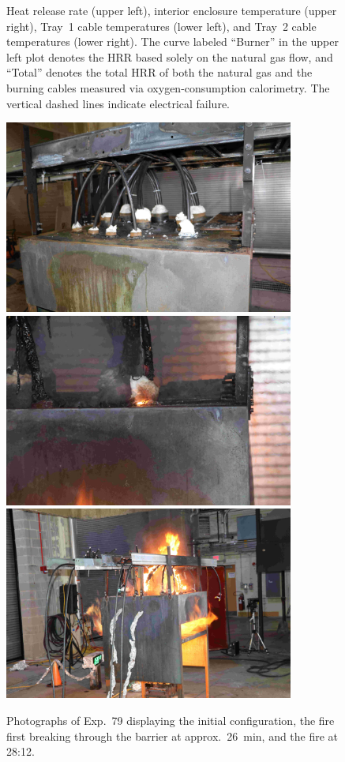 \begin{figure}[H]
\caption[HRR and temperatures of Exp.~79]{Heat release rate (upper left), interior enclosure temperature (upper right), Tray~1 cable temperatures (lower left), and Tray~2 cable temperatures (lower right). The curve labeled ``Burner'' in the upper left plot denotes the HRR based solely on the natural gas flow, and ``Total'' denotes the total HRR of both the natural gas and the burning cables measured via oxygen-consumption calorimetry. The vertical dashed lines indicate electrical failure.}
\label{fig:Test_79}
\end{figure}

\begin{figure}[p]
\centering
\includegraphics[height=2.50in]{../FIGURES/Test_79_Photo_1} \\ \vspace{0.1in}
\includegraphics[height=2.50in]{../FIGURES/Test_79_Photo_2} \\ \vspace{0.1in}
\includegraphics[height=2.50in]{../FIGURES/Test_79_Photo_3}
\caption[Photographs of Exp.~79]{Photographs of Exp.~79 displaying the initial configuration, the fire first breaking through the barrier at approx.~26~min, and the fire at 28:12.}
\label{fig:Test_79_photos}
\end{figure}


